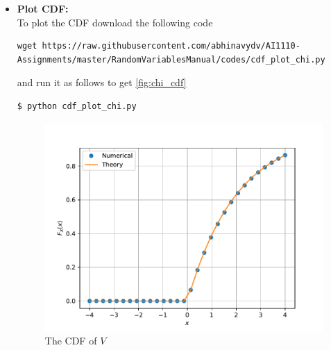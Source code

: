 \documentclass[journal,12pt,twocolumn]{IEEEtran}
\renewcommand\thesection{\arabic{section}}
\begin{document}
\begin{enumerate}[label=\thesection.\arabic*
        ,ref=\thesection.\theenumi]
\begin{itemize}
              \item \textbf{Plot CDF:}\\
                    To plot the CDF download the following code
                    \begin{lstlisting}
wget https://raw.githubusercontent.com/abhinavydv/AI1110-Assignments/master/RandomVariablesManual/codes/cdf_plot_chi.py
\end{lstlisting}
                    and run it as follows to get \autoref{fig:chi_cdf}
                    \begin{lstlisting}
$ python cdf_plot_chi.py
\end{lstlisting}
                    \begin{figure}
                        \centering
                        \includegraphics[width=\columnwidth]{./figs/chi_cdf}
                        \caption{The CDF of $V$}
                        \label{fig:chi_cdf}
                    \end{figure}


\end{itemize}
\end{enumerate}
\end{document}
